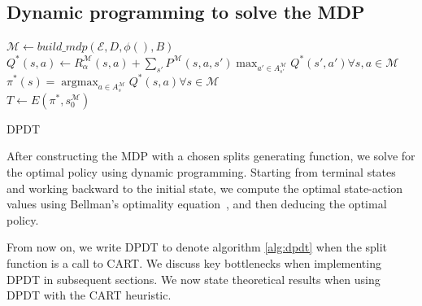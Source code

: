 \subsection{Dynamic programming to solve the MDP}
        \begin{algorithm}
            $\mathcal{M} \gets build\_mdp(\mathcal{E}, D, \phi(), B)$\label{line:build_mdp} \\
            $Q^*(s,a) \gets R_{\alpha}^{\mathcal{M}}(s,a) + \sum_{s'} P^{\mathcal{M}}(s,a,s') \max_{a' \in A_{s'}^{\mathcal{M}}} Q^*(s',a') \forall s,a \in \mathcal{M}$\\
            $\pi^*(s) = \operatorname{argmax}_{a \in A_s^{\mathcal{M}}} Q^*(s, a) \forall s \in \mathcal{M} $\\
            $T \gets E(\pi^*,s_0^{\mathcal{M}}) $
            \caption{DPDT}\label{alg:dpdt}
        \end{algorithm}
        
After constructing the MDP with a chosen splits generating function, we solve for the optimal policy using dynamic programming. Starting from terminal states and working backward to the initial state, we compute the optimal state-action values using Bellman's optimality equation~\cite{Bellman}, and then deducing the optimal policy.

From now on, we write DPDT to denote algorithm \ref{alg:dpdt} when the split function is a call to CART. We discuss key bottlenecks when implementing DPDT in subsequent sections. We now state theoretical results when using DPDT with the CART heuristic. 

